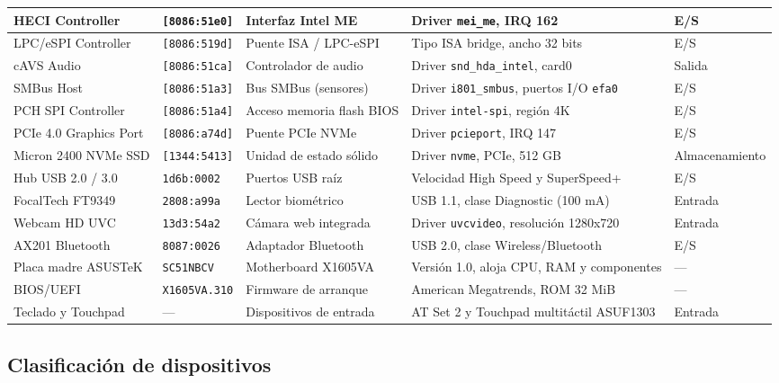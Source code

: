 \documentclass[10pt]{article}
\begin{document}
\begin{longtable}{|>{\raggedright\arraybackslash}p{2.5cm}|>{\raggedright\arraybackslash}p{2.0cm}|>{\raggedright\arraybackslash}p{2.5cm}|>{\raggedright\arraybackslash}p{4.5cm}|>{\raggedright\arraybackslash}p{2.0cm}|}
\hline
HECI Controller & \texttt{[8086:51e0]} & Interfaz Intel ME & Driver \texttt{mei\_me}, IRQ 162 & E/S \\
\hline
LPC/eSPI Controller & \texttt{[8086:519d]} & Puente ISA / LPC-eSPI & Tipo ISA bridge, ancho 32 bits & E/S \\
\hline
cAVS Audio & \texttt{[8086:51ca]} & Controlador de audio & Driver \texttt{snd\_hda\_intel}, card0 & Salida \\
\hline
SMBus Host & \texttt{[8086:51a3]} & Bus SMBus (sensores) & Driver \texttt{i801\_smbus}, puertos I/O \texttt{efa0} & E/S \\
\hline
PCH SPI Controller & \texttt{[8086:51a4]} & Acceso memoria flash BIOS & Driver \texttt{intel-spi}, región 4K & E/S \\
\hline
PCIe 4.0 Graphics Port & \texttt{[8086:a74d]} & Puente PCIe NVMe & Driver \texttt{pcieport}, IRQ 147 & E/S \\
\hline
Micron 2400 NVMe SSD & \texttt{[1344:5413]} & Unidad de estado sólido & Driver \texttt{nvme}, PCIe, 512 GB & Almacenamiento \\
\hline
Hub USB 2.0 / 3.0 & \texttt{1d6b:0002} & Puertos USB raíz & Velocidad High Speed y SuperSpeed+ & E/S \\
\hline
FocalTech FT9349 & \texttt{2808:a99a} & Lector biométrico & USB 1.1, clase Diagnostic (100 mA) & Entrada \\
\hline
Webcam HD UVC & \texttt{13d3:54a2} & Cámara web integrada & Driver \texttt{uvcvideo}, resolución 1280x720 & Entrada \\
\hline
AX201 Bluetooth & \texttt{8087:0026} & Adaptador Bluetooth & USB 2.0, clase Wireless/Bluetooth & E/S \\
\hline
Placa madre ASUSTeK & \texttt{SC51NBCV} & Motherboard X1605VA & Versión 1.0, aloja CPU, RAM y componentes & --- \\
\hline
BIOS/UEFI & \texttt{X1605VA.310} & Firmware de arranque & American Megatrends, ROM 32 MiB & --- \\
\hline
Teclado y Touchpad & --- & Dispositivos de entrada & AT Set 2 y Touchpad multitáctil ASUF1303 & Entrada \\
\hline

\end{longtable}
\endgroup

\subsection{Clasificación de dispositivos}
\end{document}
